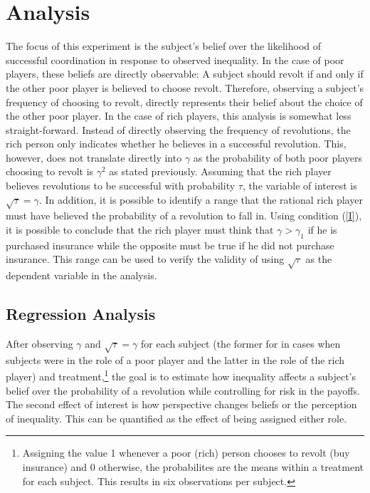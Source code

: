 \documentclass[12pt]{article}
\begin{document}
	\section{Analysis}
	The focus of this experiment is the subject's belief over the likelihood of 
	successful coordination in response to observed inequality. In the case of 
	poor players, these beliefs are directly observable: A subject should 
	revolt if and only if the other poor player is believed to choose revolt. 
	Therefore, observing a subject's frequency of choosing to revolt, directly 
	represents their belief about the choice of the other poor player. In the 
	case of rich players, this analysis is somewhat less straight-forward. 
	Instead of directly observing the frequency of revolutions, the rich person 
	only indicates whether he believes in a successful revolution. This, 
	however, does not translate directly into $\gamma$ as the probability of 
	both poor players choosing to revolt is $\gamma^2$ as stated previously.
	Assuming that the rich player believes revolutions to be successful with 
	probability $\tau$, the variable of interest is $\sqrt{\tau} = 
	\gamma$. 
	In addition, it is possible to 
	identify a range that the rational rich player must have believed the 
	probability of a revolution to fall in. Using condition (\ref{I}), it is 
	possible to conclude that the rich player must think that $\gamma>\gamma_1$ 
	if he is purchased insurance while the opposite must be true if he did not 
	purchase insurance. This range can be used to verify the validity of using 
	$\sqrt{\tau}$ as the dependent variable in the analysis.
	
	\subsection{Regression Analysis}
	After observing $\gamma$ and $\sqrt{\tau}=\gamma$ for each subject (the 
	former for in cases when subjects were in the role of a poor player and the 
	latter in the role of the rich player) and treatment,\footnote{Assigning 
	the value 1 whenever a poor (rich) person chooses to revolt (buy insurance) 
	and 0 otherwise, the probabilites are the means within a treatment for each 
	subject. This results in six observations per subject.} the goal is to 
	estimate how inequality affects a subject's belief over the probability of 
	a revolution while controlling for risk in the payoffs. The second effect 
	of interest is how perspective changes beliefs or the perception of 
	inequality. This can be quantified as the effect of being assigned either 
	role.
\end{document}

